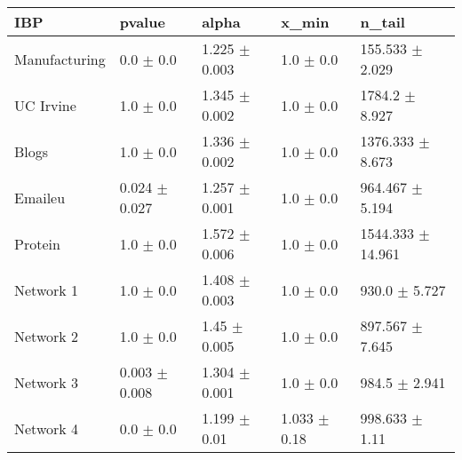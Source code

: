 \begin{tabular}{@{}lllll@{}}
\toprule

\textbf{IBP} & pvalue & alpha & x\_min & n\_tail \\\midrule

Manufacturing & 0.0 \(\pm\) 0.0 & 1.225 \(\pm\) 0.003 & 1.0 \(\pm\) 0.0 & 155.533 \(\pm\) 2.029 \\
UC Irvine & 1.0 \(\pm\) 0.0 & 1.345 \(\pm\) 0.002 & 1.0 \(\pm\) 0.0 & 1784.2 \(\pm\) 8.927 \\
Blogs & 1.0 \(\pm\) 0.0 & 1.336 \(\pm\) 0.002 & 1.0 \(\pm\) 0.0 & 1376.333 \(\pm\) 8.673 \\
Emaileu & 0.024 \(\pm\) 0.027 & 1.257 \(\pm\) 0.001 & 1.0 \(\pm\) 0.0 & 964.467 \(\pm\) 5.194 \\
Protein & 1.0 \(\pm\) 0.0 & 1.572 \(\pm\) 0.006 & 1.0 \(\pm\) 0.0 & 1544.333 \(\pm\) 14.961 \\
Network 1 & 1.0 \(\pm\) 0.0 & 1.408 \(\pm\) 0.003 & 1.0 \(\pm\) 0.0 & 930.0 \(\pm\) 5.727 \\
Network 2 & 1.0 \(\pm\) 0.0 & 1.45 \(\pm\) 0.005 & 1.0 \(\pm\) 0.0 & 897.567 \(\pm\) 7.645 \\
Network 3 & 0.003 \(\pm\) 0.008 & 1.304 \(\pm\) 0.001 & 1.0 \(\pm\) 0.0 & 984.5 \(\pm\) 2.941 \\
Network 4 & 0.0 \(\pm\) 0.0 & 1.199 \(\pm\) 0.01 & 1.033 \(\pm\) 0.18 & 998.633 \(\pm\) 1.11 \\

\bottomrule
\end{tabular}
